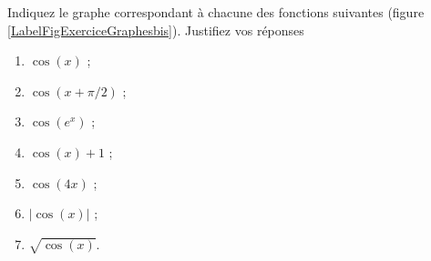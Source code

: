 
\begin{exercice}\label{exoDS2010bis-0002}

	Indiquez le graphe correspondant à chacune des fonctions suivantes (figure \ref{LabelFigExerciceGraphesbis}). Justifiez vos réponses
\begin{multicols}{3}
  \begin{enumerate}
  \item $\cos (x) $ ;
  \item $\cos (x+\pi/2) $ ;
  \item $\cos(e^x) $ ;
  \item $ \cos(x)+1$ ;
  \item $\cos (4x) $ ; 
  \item $ |\cos(x)|$ ;
  \item $ \sqrt{\cos(x)}$.
  \end{enumerate}
\end{multicols}

\newcommand{\CaptionFigExerciceGraphesbis}{Les graphes à considérer de la question \ref{exoDS2010bis-0002}.} 


\end{exercice}
